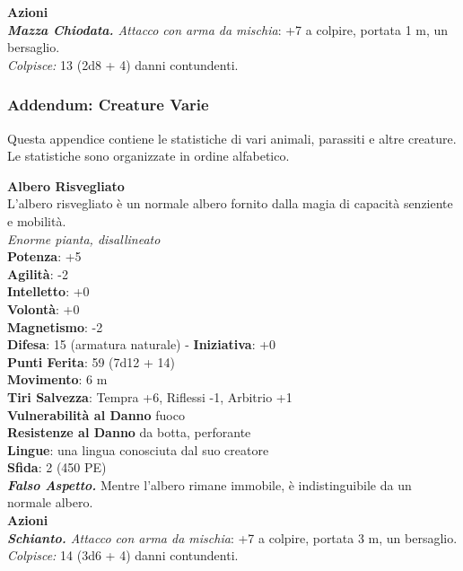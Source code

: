 \begin{multicols}{2}
\smallskip\textbf{Azioni}\\
\emph{\textbf{Mazza Chiodata.} Attacco con arma da mischia}: +7 a colpire, portata 1 m, un bersaglio.\\
\emph{Colpisce:} 13 (2d8 + 4) danni contundenti.\\

\pagebreak

\subsubsection{Addendum: Creature Varie}

Questa appendice contiene le statistiche di vari animali, parassiti e altre creature. Le statistiche sono organizzate in ordine alfabetico.

\medskip\textbf{Albero Risvegliato}\\
L'albero risvegliato è un normale albero fornito dalla magia di capacità senziente e mobilità.\\
\emph{Enorme pianta, disallineato}\\
\textbf{Potenza}: +5\\
\textbf{Agilità}: -2\\
\textbf{Intelletto}: +0\\
\textbf{Volontà}: +0\\
\textbf{Magnetismo}: -2\\
\textbf{Difesa}: 15 (armatura naturale) - \textbf{Iniziativa}: +0\\
\textbf{Punti Ferita}: 59 (7d12 + 14)\\
\textbf{Movimento}: 6 m\\
\textbf{Tiri Salvezza}: Tempra +6, Riflessi -1, Arbitrio +1\\
\textbf{Vulnerabilità al Danno} fuoco\\
\textbf{Resistenze al Danno} da botta, perforante\\
\textbf{Lingue}: una lingua conosciuta dal suo creatore\\
\textbf{Sfida}: 2 (450 PE)\smallskip\\
\emph{\textbf{Falso Aspetto.}} Mentre l'albero rimane immobile, è indistinguibile da un normale albero.\\
\smallskip\textbf{Azioni}\\
\emph{\textbf{Schianto.} Attacco con arma da mischia}: +7 a colpire, portata 3 m, un bersaglio.\\
\emph{Colpisce:} 14 (3d6 + 4) danni contundenti.\\


\end{multicols}
